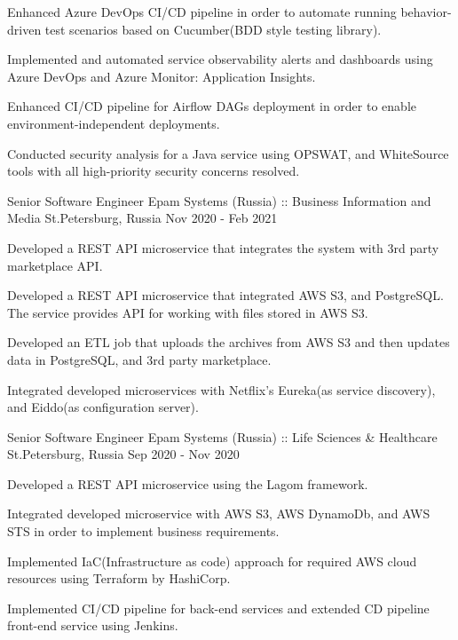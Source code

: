 \begin{cventries}
{\begin{cvitems}
    \item {Enhanced Azure DevOps CI/CD pipeline in order to automate running behavior-driven test scenarios based on Cucumber(BDD style testing library).}
    \item {Implemented and automated service observability alerts and dashboards using Azure DevOps and Azure Monitor: Application Insights.}
    \item {Enhanced CI/CD pipeline for  Airflow DAGs deployment in order to enable environment-independent deployments.}
    \item {Conducted security analysis for a Java service using OPSWAT, and WhiteSource tools with all high-priority security concerns resolved.}
  \end{cvitems}
}
\cventry
{Senior Software Engineer} %
{Epam Systems (Russia) ::  Business Information and Media} %
{St.Petersburg, Russia} %
{Nov 2020 - Feb 2021} %
{
  \begin{cvitems} %
    \item {Developed a REST API microservice that integrates the system with 3rd party marketplace API.}
    \item {Developed a REST API microservice that integrated AWS S3, and PostgreSQL. The service provides API for working with files stored in AWS S3.}
    \item {Developed an ETL job that uploads the archives from AWS S3 and then updates data in PostgreSQL, and 3rd party marketplace.}
    \item {Integrated developed microservices with Netflix's Eureka(as service discovery), and Eiddo(as configuration server).}
  \end{cvitems}
}

\cventry
{Senior Software Engineer} %
{Epam Systems (Russia) :: Life Sciences \& Healthcare} %
{St.Petersburg, Russia} %
{Sep 2020 - Nov 2020 } %
{
  \begin{cvitems} %
    \item {Developed a REST API microservice using the Lagom framework.}
    \item {Integrated developed microservice with AWS S3, AWS DynamoDb, and AWS STS in order to implement business requirements.}
    \item {Implemented IaC(Infrastructure as code) approach for required AWS cloud resources using Terraform by HashiCorp.}
    \item {Implemented CI/CD pipeline for back-end services and extended CD pipeline front-end service using Jenkins.}
  \end{cvitems}
}


\end{cventries}
